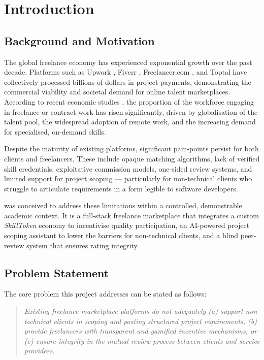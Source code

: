 \chapter{Introduction}

\section{Background and Motivation}

The global freelance economy has experienced exponential growth over the past decade. Platforms such as Upwork \cite{upwork2024}, Fiverr \cite{fiverr2024}, Freelancer.com \cite{freelancer2024}, and Toptal \cite{toptal2024} have collectively processed billions of dollars in project payments, demonstrating the commercial viability and societal demand for online talent marketplaces. According to recent economic studies \cite{freelanceEconomy2023}, the proportion of the workforce engaging in freelance or contract work has risen significantly, driven by globalisation of the talent pool, the widespread adoption of remote work, and the increasing demand for specialised, on-demand skills.

Despite the maturity of existing platforms, significant pain-points persist for both clients and freelancers. These include opaque matching algorithms, lack of verified skill credentials, exploitative commission models, one-sided review systems, and limited support for project scoping --- particularly for non-technical clients who struggle to articulate requirements in a form legible to software developers.

\textbf{\projectname{}} was conceived to address these limitations within a controlled, demonstrable academic context. It is a full-stack freelance marketplace that integrates a custom \textit{SkillToken} economy to incentivise quality participation, an AI-powered project scoping assistant to lower the barriers for non-technical clients, and a blind peer-review system that ensures rating integrity.

\section{Problem Statement}

The core problem this project addresses can be stated as follows:

\begin{quote}
\textit{Existing freelance marketplace platforms do not adequately (a) support non-technical clients in scoping and posting structured project requirements, (b) provide freelancers with transparent and gamified incentive mechanisms, or (c) ensure integrity in the mutual review process between clients and service providers.}
\end{quote}

